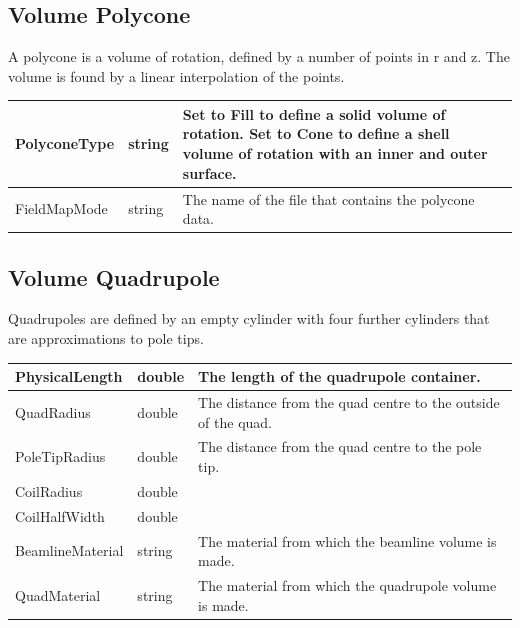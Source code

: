 \subsection{Volume Polycone}
A polycone is a volume of rotation, defined by a number of points in r and z. The volume is found by a linear
interpolation of the points.

\begin{center}
\tabletail{}
\tablelasttail{}
\begin{supertabular}{|m{3.665cm}|m{1.278cm}|m{12.052cm}|}
\hline
PolyconeType &
string &
Set to Fill to define a solid volume of rotation. Set to Cone to define a shell volume of rotation with an inner and
outer surface.\\\hline
FieldMapMode &
string &
The name of the file that contains the polycone data.\\\hline
\end{supertabular}
\end{center}
\subsection{Volume Quadrupole}
Quadrupoles are defined by an empty cylinder with four further cylinders that are approximations to pole tips.

\begin{center}
\tabletail{}
\tablelasttail{}
\begin{supertabular}{|m{3.665cm}|m{1.278cm}|m{12.052cm}|}
\hline
PhysicalLength &
double &
The length of the quadrupole container.\\\hline
QuadRadius &
double &
The distance from the quad centre to the outside of the quad.\\\hline
PoleTipRadius &
double &
The distance from the quad centre to the pole tip.\\\hline
CoilRadius &
double &
~
\\\hline
CoilHalfWidth &
double &
~
\\\hline
BeamlineMaterial &
string &
The material from which the beamline volume is made.\\\hline
QuadMaterial &
string &
The material from which the quadrupole volume is made.\\\hline
\end{supertabular}
\end{center}
